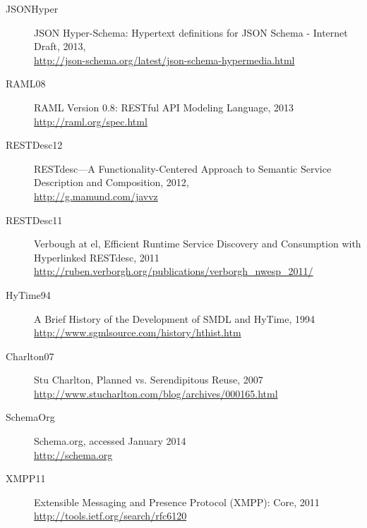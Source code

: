 \documentclass{wsrest2014}
\begin{document}
\begin{description}
 \item[JSONHyper] \label{JSONHyper}\hypertarget{JSONHyper}{} JSON Hyper-Schema: Hypertext definitions for JSON Schema - Internet Draft, 2013, \\\href{http://json-schema.org/latest/json-schema-hypermedia.html}{http://json-schema.org/latest/json-schema-hypermedia.html}


 \item[RAML08] \label{RAML08}\hypertarget{RAML08}{} RAML Version 0.8: RESTful API Modeling Language, 2013 \\\href{http://raml.org/spec.html}{http://raml.org/spec.html}


 \item[RESTDesc12] \label{RESTDesc12}\hypertarget{RESTDesc12}{} RESTdesc—A Functionality-Centered Approach to Semantic Service Description and Composition, 2012, \\\href{http://g.mamund.com/javvz}{http://g.mamund.com/javvz}


 \item[RESTDesc11] \label{RESTDesc11}\hypertarget{RESTDesc11}{} Verbough at el, \textquotedbl{}Efficient Runtime Service Discovery and Consumption with Hyperlinked RESTdesc\textquotedbl{}, 2011 \\\href{http://ruben.verborgh.org/publications/verborgh\_{}nwesp\_{}2011/}{http://ruben.verborgh.org/publications/verborgh\_{}nwesp\_{}2011/}


 \item[HyTime94] \label{HyTime94}\hypertarget{HyTime94}{} A Brief History of the Development of SMDL and HyTime, 1994 \\\href{http://www.sgmlsource.com/history/hthist.htm}{http://www.sgmlsource.com/history/hthist.htm}


 \item[Charlton07] \label{Charlton07}\hypertarget{Charlton07}{} Stu Charlton, \textquotedbl{}Planned vs. Serendipitous Reuse\textquotedbl{}, 2007 \\\href{http://www.stucharlton.com/blog/archives/000165.html}{http://www.stucharlton.com/blog/archives/000165.html}


 \item[SchemaOrg] \label{SchemaOrg}\hypertarget{SchemaOrg}{} Schema.org, accessed January 2014 \\\href{http://schema.org}{http://schema.org}


 \item[XMPP11] \label{XMPP11}\hypertarget{XMPP11}{} Extensible Messaging and Presence Protocol (XMPP): Core, 2011 \\\href{http://tools.ietf.org/search/rfc6120}{http://tools.ietf.org/search/rfc6120}



\end{description}
\end{document}
